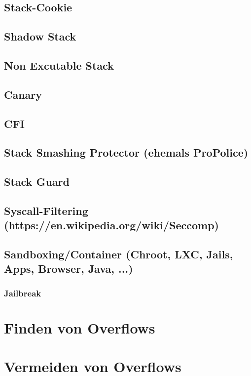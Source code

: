 \documentclass[12pt]{book}
\begin{document}
\section{Stack-Cookie}

\section{Shadow Stack}

\section{Non Excutable Stack}

\section{Canary}

\section{CFI}

\section{Stack Smashing Protector (ehemals ProPolice)}

\section{Stack Guard}

\section{Syscall-Filtering (https://en.wikipedia.org/wiki/Seccomp)}

\section{Sandboxing/Container (Chroot, LXC, Jails, Apps, Browser, Java, ...)}

\subsection{Jailbreak}

\chapter{Finden von Overflows}

\chapter{Vermeiden von Overflows}
\end{document}
